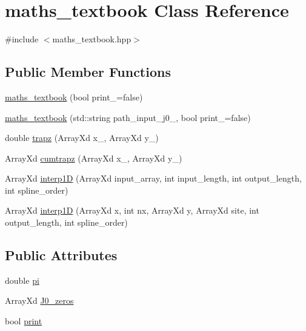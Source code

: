\hypertarget{classmaths__textbook}{}\section{maths\+\_\+textbook Class Reference}
\label{classmaths__textbook}


{\ttfamily \#include $<$maths\+\_\+textbook.\+hpp$>$}

\subsection*{Public Member Functions}
\begin{DoxyCompactItemize}
\item 
\mbox{\hyperlink{classmaths__textbook_a5a7c7fedbd125f32ce35deb6664a19d9}{maths\+\_\+textbook}} (bool print\+\_\+=false)
\item 
\mbox{\hyperlink{classmaths__textbook_a56743163bbb37c83a95d8cb1ca1cc35b}{maths\+\_\+textbook}} (std\+::string path\+\_\+input\+\_\+j0\+\_\+, bool print\+\_\+=false)
\item 
double \mbox{\hyperlink{classmaths__textbook_a158ce9c89ee1db5495810c25ee2aed57}{trapz}} (Array\+Xd x\+\_\+, Array\+Xd y\+\_\+)
\item 
Array\+Xd \mbox{\hyperlink{classmaths__textbook_ae893700d202ab9a84e33974f9ca42da3}{cumtrapz}} (Array\+Xd x\+\_\+, Array\+Xd y\+\_\+)
\item 
Array\+Xd \mbox{\hyperlink{classmaths__textbook_a803caea252953788b96a898a3bab9bd0}{interp1D}} (Array\+Xd input\+\_\+array, int input\+\_\+length, int output\+\_\+length, int spline\+\_\+order)
\item 
Array\+Xd \mbox{\hyperlink{classmaths__textbook_ac4789e1e67a597303faab6cc5fa889ec}{interp1D}} (Array\+Xd x, int nx, Array\+Xd y, Array\+Xd site, int output\+\_\+length, int spline\+\_\+order)
\end{DoxyCompactItemize}
\subsection*{Public Attributes}
\begin{DoxyCompactItemize}
\item 
double \mbox{\hyperlink{classmaths__textbook_a96b811ef2a81ca51b98cf2a10c8ac5bc}{pi}}
\item 
Array\+Xd \mbox{\hyperlink{classmaths__textbook_a41398eada5e3eb88fb64d044c14aed26}{J0\+\_\+zeros}}
\item 
bool \mbox{\hyperlink{classmaths__textbook_ae2a8fbebf9b44587f2d21df219c10812}{print}}
\end{DoxyCompactItemize}
